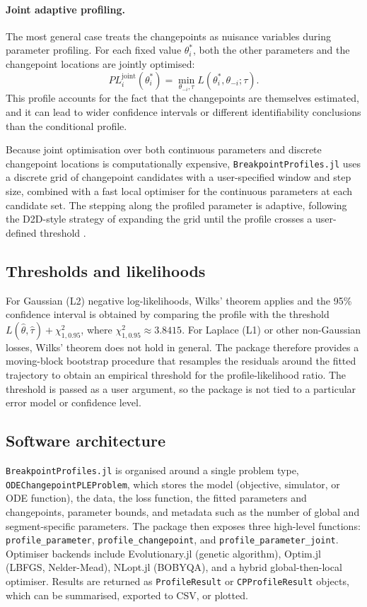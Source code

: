 \documentclass[10pt,letterpaper]{article}
\begin{document}
\paragraph*{Joint adaptive profiling.}
The most general case treats the changepoints as nuisance variables during parameter profiling. For each fixed value $\theta_i^*$, both the other parameters and the changepoint locations are jointly optimised:
\begin{equation}
\label{eq:joint}
PL_i^{\text{joint}}(\theta_i^*) = \min_{\theta_{-i}, \tau} L(\theta_i^*, \theta_{-i}; \tau).
\end{equation}
This profile accounts for the fact that the changepoints are themselves estimated, and it can lead to wider confidence intervals or different identifiability conclusions than the conditional profile.

Because joint optimisation over both continuous parameters and discrete changepoint locations is computationally expensive, \texttt{BreakpointProfiles.jl} uses a discrete grid of changepoint candidates with a user-specified window and step size, combined with a fast local optimiser for the continuous parameters at each candidate set. The stepping along the profiled parameter is adaptive, following the D2D-style strategy of expanding the grid until the profile crosses a user-defined threshold \cite{d2d2015}.

\subsection*{Thresholds and likelihoods}
For Gaussian (L2) negative log-likelihoods, Wilks' theorem applies and the 95\% confidence interval is obtained by comparing the profile with the threshold $L(\hat{\theta}, \hat{\tau}) + \chi^2_{1, 0.95}$, where $\chi^2_{1, 0.95} \approx 3.8415$. For Laplace (L1) or other non-Gaussian losses, Wilks' theorem does not hold in general. The package therefore provides a moving-block bootstrap procedure that resamples the residuals around the fitted trajectory to obtain an empirical threshold for the profile-likelihood ratio. The threshold is passed as a user argument, so the package is not tied to a particular error model or confidence level.

\subsection*{Software architecture}
\texttt{BreakpointProfiles.jl} is organised around a single problem type, \texttt{ODEChangepointPLEProblem}, which stores the model (objective, simulator, or ODE function), the data, the loss function, the fitted parameters and changepoints, parameter bounds, and metadata such as the number of global and segment-specific parameters. The package then exposes three high-level functions: \texttt{profile\_parameter}, \texttt{profile\_changepoint}, and \texttt{profile\_parameter\_joint}. Optimiser backends include Evolutionary.jl (genetic algorithm), Optim.jl (LBFGS, Nelder-Mead), NLopt.jl (BOBYQA), and a hybrid global-then-local optimiser. Results are returned as \texttt{ProfileResult} or \texttt{CPProfileResult} objects, which can be summarised, exported to CSV, or plotted.
\end{document}
